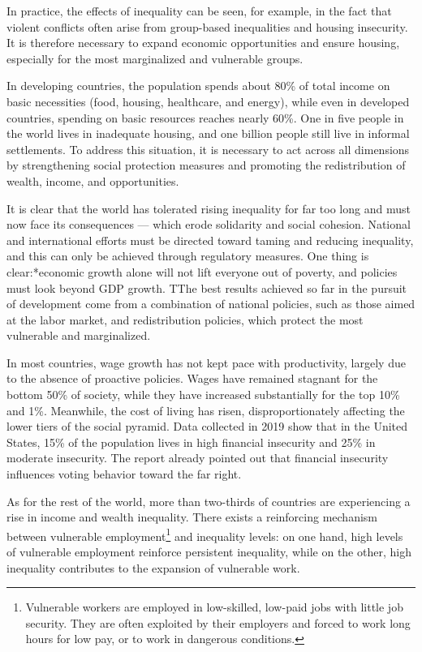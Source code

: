 In practice, the effects of inequality can be seen, for example, in the fact that violent conflicts often arise from group-based inequalities and housing insecurity. It is therefore necessary to expand economic opportunities and ensure housing, especially for the most marginalized and vulnerable groups.

In developing countries, the population spends about 80\% of total income on basic necessities (food, housing, healthcare, and energy), while even in developed countries, spending on basic resources reaches nearly 60\%. One in five people in the world lives in inadequate housing, and one billion people still live in informal settlements. To address this situation, it is necessary to act across all dimensions by strengthening social protection measures and promoting the redistribution of wealth, income, and opportunities.

It is clear that the world has tolerated rising inequality for far too long and must now face its consequences — which erode solidarity and social cohesion. National and international efforts must be directed toward taming and reducing inequality, and this can only be achieved through regulatory measures. One thing is clear:*economic growth alone will not lift everyone out of poverty, and policies must look beyond GDP growth. TThe best results achieved so far in the pursuit of development come from a combination of national policies, such as those aimed at the labor market, and redistribution policies, which protect the most vulnerable and marginalized.

In most countries, wage growth has not kept pace with productivity, largely due to the absence of proactive policies. Wages have remained stagnant for the bottom 50\% of society, while they have increased substantially for the top 10\% and 1\%. Meanwhile, the cost of living has risen, disproportionately affecting the lower tiers of the social pyramid. Data collected in 2019 show that in the United States, 15\% of the population lives in high financial insecurity and 25\% in moderate insecurity. The report already pointed out that financial insecurity influences voting behavior toward the far right.

As for the rest of the world, more than two-thirds of countries are experiencing a rise in income and wealth inequality. There exists a reinforcing mechanism between vulnerable employment\footnote{Vulnerable workers are employed in low-skilled, low-paid jobs with little job security. They are often exploited by their employers and forced to work long hours for low pay, or to work in dangerous conditions.} and inequality levels: on one hand, high levels of vulnerable employment reinforce persistent inequality, while on the other, high inequality contributes to the expansion of vulnerable work. %

